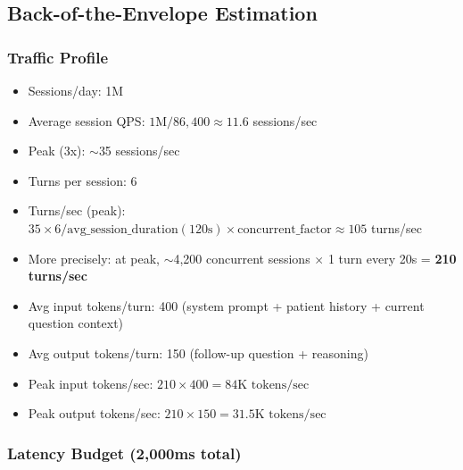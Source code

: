 \subsection*{Back-of-the-Envelope Estimation}

\subsubsection*{Traffic Profile}
\begin{itemize}
  \item Sessions/day: 1M
  \item Average session QPS: $1\text{M} / 86{,}400 \approx 11.6$ sessions/sec
  \item Peak (3x): $\sim$35 sessions/sec
  \item Turns per session: 6
  \item Turns/sec (peak): $35 \times 6 / \text{avg\_session\_duration}(120\text{s}) \times \text{concurrent\_factor} \approx 105$ turns/sec
  \item More precisely: at peak, $\sim$4,200 concurrent sessions $\times$ 1 turn every 20s = \textbf{210 turns/sec}
  \item Avg input tokens/turn: 400 (system prompt + patient history + current question context)
  \item Avg output tokens/turn: 150 (follow-up question + reasoning)
  \item Peak input tokens/sec: $210 \times 400 = 84\text{K tokens/sec}$
  \item Peak output tokens/sec: $210 \times 150 = 31.5\text{K tokens/sec}$
\end{itemize}

\subsubsection*{Latency Budget (2,000ms total)}

